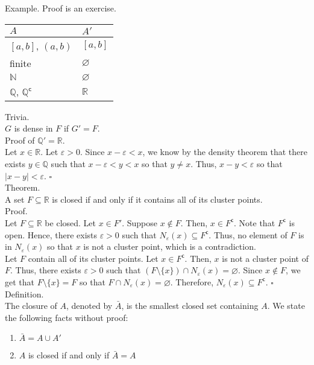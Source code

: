 \documentclass[twocolumn]{article}
\newcommand{\qed}{$\square$}
\newcommand{\br}{\vspace{\baselineskip}}
\newcommand{\COMPLEMENT}{^\mathsf{c}}
\let\complement\COMPLEMENT
\let\emptyset\varnothing
\let\eps\varepsilon
\newcommand{\naturals}{\mathbb{N}}
\newcommand{\rationals}{\mathbb{Q}}
\newcommand{\irrationals}{\rationals\complement}
\newcommand{\reals}{\mathbb{R}}
\begin{document}
Example. Proof is an exercise. \\
\begin{tabular}{l | l}
$A$ & $A'$ \\ \hline
$[a, b]$, $(a, b)$ & $[a, b]$ \\
finite & $\emptyset$ \\
$\naturals$ & $\emptyset$ \\
$\rationals$, $\irrationals$ & $\reals$
\end{tabular} \br

Trivia. \\
$G$ is dense in $F$ if $G' = F$. \\

Proof of $\rationals' = \reals$. \\
Let $x \in \reals$. Let $\eps > 0$. Since $x - \eps < x$, we know by the density theorem that there exists $y \in \rationals$ such that $x - \eps < y < x$ so that $y \neq x$. Thus, $x - y < \eps$ so that $|x - y| < \eps$. \qed \\

Theorem. \\
A set $F \subseteq \reals$ is closed if and only if it contains all of its cluster points. \\
Proof. \\
Let $F \subseteq \reals$ be closed. Let $x \in F'$. Suppose $x \not\in F$. Then, $x \in F\complement$. Note that $F\complement$ is open. Hence, there exists $\eps > 0$ such that $N_\eps(x) \subseteq F\complement$. Thus, no element of $F$ is in $N_\eps(x)$ so that $x$ is not a cluster point, which is a contradiction. \\
Let $F$ contain all of its cluster points. Let $x \in F\complement$. Then, $x$ is not a cluster point of $F$. Thus, there exists $\eps > 0$ such that $(F \setminus \{ x \}) \cap N_\eps(x) = \emptyset$. Since $x \not\in F$, we get that $F \setminus \{ x \} = F$ so that $F \cap N_\eps(x) = \emptyset$. Therefore, $N_\eps(x) \subseteq F\complement$. \qed \\

Definition. \\
The closure of $A$, denoted by $\bar{A}$, is the smallest closed set containing $A$. We state the following facts without proof:
\begin{enumerate}
	\item
		$\bar{A} = A \cup A'$
	\item
		$A$ is closed if and only if $\bar{A} = A$
\end{enumerate} \br
\end{document}
